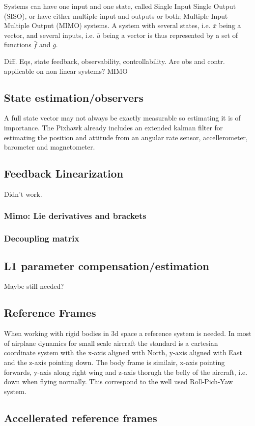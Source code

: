 \documentclass{article}
\begin{document}
Systems can have one input and one state, called Single Input Single Output (SISO), or have either multiple input and outputs or both; Multiple Input Multiple Output (MIMO) systems.
A system with several states, i.e. $\bar{x}$ being a vector, and several inputs, i.e. $\bar{u}$ being a vector is thus represented by a set of functions $\bar{f}$ and $\bar{g}$.

Diff. Eqs, state feedback, observability, controllability.
Are obs and contr. applicable on non linear systems?
MIMO
\subsection{State estimation/observers}
A full state vector may not always be exactly measurable so estimating it is of importance.
The Pixhawk already includes an extended kalman filter for estimating the position and attitude from an angular rate sensor, accellerometer, barometer and magnetometer.
\subsection{Feedback Linearization}
Didn't work.
\subsubsection{Mimo: Lie derivatives and brackets}
\subsubsection{Decoupling matrix}
\subsection{L1 parameter compensation/estimation}
Maybe still needed?
\subsection{Reference Frames}
When working with rigid bodies in 3d space a reference system is needed.
In most of airplane dynamics for small scale aircraft the standard is a cartesian coordinate system with the x-axis aligned with North, y-axis aligned with East and the z-axis pointing down.
The body frame is similair, x-axis pointing forwards, y-axis along right wing and z-axis thorugh the belly of the aircraft, i.e. down when flying normally.
This correspond to the well used Roll-Pich-Yaw system.\cite{nelson}

\subsection{Accellerated reference frames}
\end{document}
